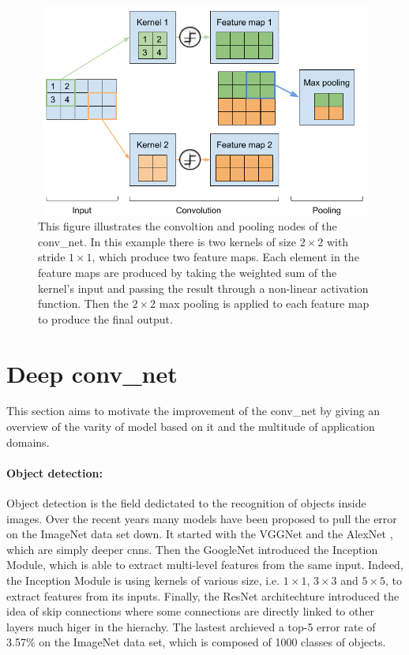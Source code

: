\documentclass[11pt]{report}
\begin{document}
\begin{figure}[h]
\centering
\includegraphics[width=12cm, height=7cm]{conv_net}
\caption[Illustration of convoltion and max pooling layers]{This figure illustrates the convoltion and pooling nodes of the \acrshort{conv_net}. In this example there is two kernels of size $2\times2$ with stride $1\times1$, which produce two feature maps. Each element in the feature maps are produced by taking the weighted sum of the kernel's input and passing the result through a non-linear activation function. Then the $2\times2$ max pooling is applied to each feature map to produce the final output.}
\label{fig:conv_net}
\end{figure}
\section{Deep \acrshort{conv_net}}

This section aims to motivate the improvement of the \acrshort{conv_net} by giving an overview of the varity of model based on it and the multitude of application domains.

\paragraph{Object detection:} Object detection is the field dedictated to the recognition of objects inside images. Over the recent years many models have been proposed to pull the error on the ImageNet data set \cite{imagenet_cvpr09} down. It started with the VGGNet \cite{DBLP:journals/corr/RussakovskyDSKSMHKKBBF14} and the AlexNet \cite{DBLP:journals/cacm/KrizhevskySH17}, which are simply deeper \acrshort{cnn}s. Then the GoogleNet \cite{DBLP:conf/cvpr/SzegedyLJSRAEVR15} introduced the Inception Module, which is able to extract multi-level features from the same input. Indeed, the Inception Module is using kernels of various size, i.e. $1\times1$, $3\times3$ and $5\times5$, to extract features from its inputs. Finally, the ResNet architechture \cite{DBLP:conf/cvpr/HeZRS16} introduced the idea of skip connections where some connections are directly linked to other layers much higer in the hierachy. The lastest archieved a top-5 error rate of 3.57\% on the ImageNet data set, which is composed of 1000 classes of objects.\newline
\end{document}
